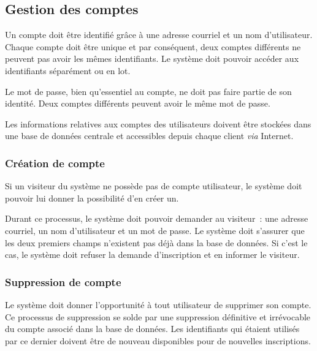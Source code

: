 \subsection{Gestion des comptes}

Un compte doit être identifié grâce à une adresse courriel
et un nom d'utilisateur. Chaque compte doit être unique
et par conséquent, deux comptes différents ne peuvent pas avoir
les mêmes identifiants. Le système doit pouvoir accéder aux
identifiants séparément ou en lot.

Le mot de passe, bien qu'essentiel au compte, ne doit pas
faire
partie de son identité. Deux comptes différents
peuvent avoir le même mot de passe.

Les informations relatives aux comptes des utilisateurs
doivent être stockées dans une base de données centrale et
accessibles depuis chaque client \emph{via} Internet.

\subsubsection{Création de compte}

Si un visiteur du système ne possède pas de compte
utilisateur, le système doit pouvoir lui donner la
possibilité d'en créer un.

Durant ce processus, le système doit pouvoir demander au
visiteur~: une adresse courriel, un nom d'utilisateur et un
mot de passe. Le système doit s'assurer que les deux
premiers champs n'existent pas déjà dans la base de données.
Si c'est le cas, le système doit refuser la demande
d'inscription et en informer le visiteur.


\subsubsection{Suppression de compte}

Le système doit donner l'opportunité à tout utilisateur de
supprimer son compte. Ce processus de suppression se solde
par une suppression définitive et irrévocable du compte
associé dans la base de données.
Les identifiants qui étaient utilisés par ce
dernier doivent être de nouveau disponibles pour de
nouvelles inscriptions.

